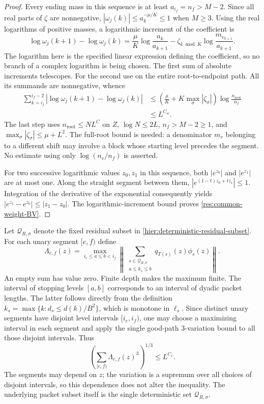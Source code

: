 \begin{proof}
Every ending mass in this sequence is at least
$a_{i_f}=n_f>M-2$.  Since all real parts of $\zeta$ are nonnegative,
$|\omega_j(k)|\le a_k^{-\mu/K}\le1$ when $M\ge3$.
Using the real logarithms of positive masses, a logarithmic
increment of the coefficient is
\[
 \log\omega_j(k+1)-\log\omega_j(k)
 =\frac{\mu}{K}\log\frac{a_k}{a_{k+1}}
     -\zeta_{k\bmod K}\log\frac{m_{v_{k+1}}}{a_{k+1}}.
\]
The logarithm here is the specified linear expression defining the
coefficient, so no branch of a complex logarithm is being chosen.
The first sum of absolute increments telescopes.  For the second
use  on the entire root-to-endpoint
path.  All its summands are nonnegative, whence
\begin{align*}
 \sum_{k=i_j}^{i_f-2}
    |\log\omega_j(k+1)-\log\omega_j(k)|
 &\le \left(\frac{\mu}{K}
          +K\max_\sigma|\zeta_\sigma|\right)
            \log\frac{n_{\mathrm{root}}}{n_f} \\
 &\le L^{C_w}.
\end{align*}
The last step uses $n_{\mathrm{root}}\le NL^C$ on $Z$,
$\log N\le2L$, $n_f> M-2\ge1$, and
$\max_\sigma|\zeta_\sigma|\le\mu+L^2$.
The full-root bound is needed: a denominator $m_v$ belonging to a
different shift may involve a block whose starting level precedes
the segment.  No estimate using only $\log(n_e/n_f)$ is asserted.

For two successive logarithmic values $z_0,z_1$ in this sequence,
both $|e^{z_0}|$ and $|e^{z_1}|$ are at most one.  Along the straight
segment between them, $|e^{(1-t)z_0+tz_1}|\le1$.  Integration of
the derivative of the exponential consequently yields
$|e^{z_1}-e^{z_0}|\le|z_1-z_0|$.
The logarithmic-increment bound proves
\eqref{res:common-weight-BV}.
\end{proof}

Let $\mathcal Q_{R,\sigma}$ denote the fixed residual subset in
\eqref{hier:deterministic-residual-subset}.  For each unary segment $[e,f)$ define
\[
 \Lambda_{e,f}(z)=
    \max_{i_e\le a\le b<i_f}
       \left\|\sum_{\substack{s\in\mathcal Q_{R,\sigma}\\
                              a\le k_s\le b}}
                       q_{T(s)}(z)\phi_s(z)\right\|.
\]
An empty sum has value zero.  Finite depth makes the maximum finite.
The interval of stopping levels $[a,b]$ corresponds to an interval
of dyadic packet lengths.  The latter follows directly from the
definition $k_s=\max\{k:d_s\le d(k)/B^2\}$, which is monotone
in $\ell_s$.  Since distinct unary segments have disjoint level
intervals $[i_e,i_f)$, one may choose a maximizing interval in each
segment and apply the single good-path $3$-variation bound to all
those disjoint intervals.  Thus
\begin{equation}
  \left(\sum_{[e,f)}\Lambda_{e,f}(z)^3\right)^{1/3}
       \le L^{C_v}.
  \label{res:segment-cube-sum}
\end{equation}
The segments may depend on $z$; the variation is a supremum over
all choices of disjoint intervals, so this dependence does not
alter the inequality.  The underlying packet subset itself is the
single deterministic set $\mathcal Q_{R,\sigma}$.

